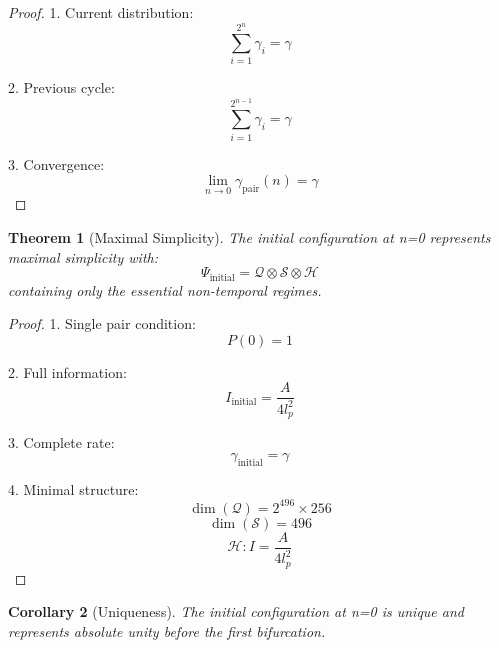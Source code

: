 \documentclass{article}
\newtheorem{theorem}{Theorem}
\newtheorem{corollary}[theorem]{Corollary}
\begin{document}
\begin{proof}
1. Current distribution:
   \begin{equation}
   \sum_{i=1}^{2^n} γ_i = γ
   \end{equation}

2. Previous cycle:
   \begin{equation}
   \sum_{i=1}^{2^{n-1}} γ_i = γ
   \end{equation}

3. Convergence:
   \begin{equation}
   \lim_{n \to 0} γ_{\text{pair}}(n) = γ
   \end{equation}
\end{proof}

\begin{theorem}[Maximal Simplicity]
The initial configuration at n=0 represents maximal simplicity with:
\begin{equation}
\Psi_{\text{initial}} = \mathcal{Q} \otimes \mathcal{S} \otimes \mathcal{H}
\end{equation}
containing only the essential non-temporal regimes.
\end{theorem}

\begin{proof}
1. Single pair condition:
   \begin{equation}
   P(0) = 1
   \end{equation}

2. Full information:
   \begin{equation}
   I_{\text{initial}} = \frac{A}{4l_p^2}
   \end{equation}

3. Complete rate:
   \begin{equation}
   γ_{\text{initial}} = γ
   \end{equation}

4. Minimal structure:
   \begin{equation}
   \dim(\mathcal{Q}) = 2^{496} \times 256
   \end{equation}
   \begin{equation}
   \dim(\mathcal{S}) = 496
   \end{equation}
   \begin{equation}
   \mathcal{H}: I = \frac{A}{4l_p^2}
   \end{equation}
\end{proof}

\begin{corollary}[Uniqueness]
The initial configuration at n=0 is unique and represents absolute unity before the first bifurcation.
\end{corollary}
\end{document}
